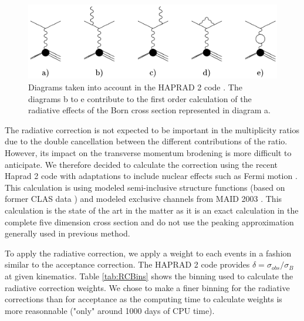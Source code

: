\begin{figure}[htp]
\centering
\includegraphics[width=12cm] {chap5-fig/RadDiag.png}
\caption {Diagrams taken into account in the HAPRAD 2 code \cite{Akushevich:2007jc}. The 
diagrams b to e contribute to the first order calculation of the radiative 
effects of the Born cross section represented in diagram a.}
\label{fig:FDRadCorr}
\end{figure}

The radiative correction is not expected to be important in the multiplicity 
ratios due to the double cancellation between the different contributions of 
the ratio. However, its impact on the transverse momentum brodening is more 
difficult to anticipate. We therefore decided to calculate the correction using 
the recent Haprad 2 code \cite{Akushevich:2007jc} with adaptations to include
nuclear effects such as Fermi motion \cite{Osipenko:PC}. This calculation is
using modeled semi-inclusive structure functions (based on former CLAS
data \cite{Akushevich:2007jc}) and modeled exclusive channels from MAID 2003
\cite{Drechsel:1998hk}. This calculation is the state of the art in the matter
as it is an exact calculation in the complete five dimension cross section
and do not use the peaking approximation generally used in previous method.

To apply the radiative correction, we apply a weight to each events in a fashion
similar to the acceptance correction. The HAPRAD 2 code provides 
$\delta = \sigma_{obs} / \sigma_B$ at given kinematics. Table \ref{tab:RCBins} 
shows the binning used to calculate the radiative correction weights.
We chose to make a finer 
binning for the radiative corrections than for acceptance as the computing time 
to calculate weights is more reasonnable ("only" around 1000 days of CPU time). 

